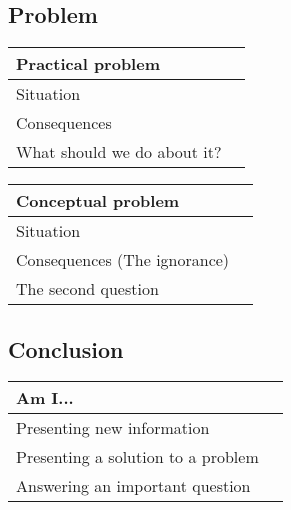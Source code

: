 \documentclass[10pt, a4paper]{article}
\begin{document}
\subsection{Problem}

\begin{center}
	\begin{tabular}{|l |l|}
		\hline
		Practical problem &\\
		\hline
		Situation&\\
		\hline
		Consequences&\\
		\hline
		What should we do about it?&\\
		\hline
	\end{tabular}
\end{center}
\begin{center}
	\begin{tabular}{|l |l|}
		\hline
		Conceptual problem&\\
		\hline
		Situation&\\
		\hline
		Consequences (The ignorance)&\\
		\hline
		The second question&\\
		\hline
	\end{tabular}
\end{center}

\subsection{Conclusion}
\begin{center}
	\begin{tabular}{|l |l|}
		\hline
		Am I... & \\
		\hline
		Presenting new information & \\
		\hline
		Presenting a solution to a problem & \\
		\hline
		Answering an important question &\\ 
		\hline
	\end{tabular}
\end{center}
\end{document}
